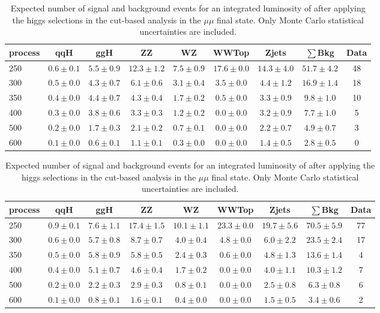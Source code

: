 \begin{table}
{\footnotesize
 \begin{center}
 \begin{tabular}{l c c c c c c c c }
 \hline
 process & qqH & ggH & ZZ & WZ & WWTop & Zjets & $\sum$Bkg & Data \\
 \hline
250 & $0.6\pm0.1$ & $5.5\pm0.9$ & $12.3\pm1.2$ & $7.5\pm0.9$ & $17.6\pm0.0$ & $14.3\pm4.0$ & $51.7\pm4.2$ & 48 \\
300 & $0.5\pm0.0$ & $4.3\pm0.7$ & $6.1\pm0.6$ & $3.1\pm0.4$ & $3.5\pm0.0$ & $4.4\pm1.2$ & $16.9\pm1.4$ & 18 \\
350 & $0.4\pm0.0$ & $4.4\pm0.7$ & $4.3\pm0.4$ & $1.7\pm0.2$ & $0.5\pm0.0$ & $3.3\pm0.9$ & $9.8\pm1.0$ & 10 \\
400 & $0.3\pm0.0$ & $3.8\pm0.6$ & $3.3\pm0.3$ & $1.2\pm0.2$ & $0.0\pm0.0$ & $3.2\pm0.9$ & $7.7\pm1.0$ & 5 \\
500 & $0.2\pm0.0$ & $1.7\pm0.3$ & $2.1\pm0.2$ & $0.7\pm0.1$ & $0.0\pm0.0$ & $2.2\pm0.7$ & $4.9\pm0.7$ & 3 \\
600 & $0.1\pm0.0$ & $0.6\pm0.1$ & $1.1\pm0.1$ & $0.3\pm0.0$ & $0.0\pm0.0$ & $1.4\pm0.5$ & $2.8\pm0.5$ & 0 \\
\hline
\end{tabular}
\end{center}
\label{tab:yield_cutbased_ee}
}
\caption{Expected number of signal and background events for an 
  integrated luminosity of \intlumi after applying the higgs selections in the cut-based analysis in the ee final state. 
  Only Monte Carlo statistical uncertainties are included. }
{\footnotesize
 \begin{center}
 \begin{tabular}{l c c c c c c c c }
 \hline
 process & qqH & ggH & ZZ & WZ & WWTop & Zjets & $\sum$Bkg & Data \\
 \hline
250 & $0.9\pm0.1$ & $7.6\pm1.1$ & $17.4\pm1.5$ & $10.1\pm1.1$ & $23.3\pm0.0$ & $19.7\pm5.6$ & $70.5\pm5.9$ & 77 \\
300 & $0.6\pm0.0$ & $5.7\pm0.8$ & $8.7\pm0.7$ & $4.0\pm0.4$ & $4.8\pm0.0$ & $6.0\pm2.2$ & $23.5\pm2.4$ & 17 \\
350 & $0.5\pm0.0$ & $5.8\pm0.9$ & $5.8\pm0.5$ & $2.4\pm0.3$ & $0.6\pm0.0$ & $4.8\pm1.3$ & $13.6\pm1.4$ & 4 \\
400 & $0.4\pm0.0$ & $5.1\pm0.7$ & $4.6\pm0.4$ & $1.7\pm0.2$ & $0.0\pm0.0$ & $4.0\pm1.1$ & $10.3\pm1.2$ & 7 \\
500 & $0.2\pm0.0$ & $2.2\pm0.3$ & $2.9\pm0.3$ & $0.8\pm0.1$ & $0.0\pm0.0$ & $2.5\pm0.8$ & $6.3\pm0.8$ & 6 \\
600 & $0.1\pm0.0$ & $0.8\pm0.1$ & $1.6\pm0.1$ & $0.4\pm0.0$ & $0.0\pm0.0$ & $1.5\pm0.5$ & $3.4\pm0.6$ & 2 \\
\hline
\end{tabular}
\label{tab:yield_cutbased_mm}
\end{center}
}
\caption{Expected number of signal and background events for an 
  integrated luminosity of \intlumi after applying the higgs selections in the cut-based analysis in the $\mu\mu$ final state. 
  Only Monte Carlo statistical uncertainties are included. }
\end{table}
